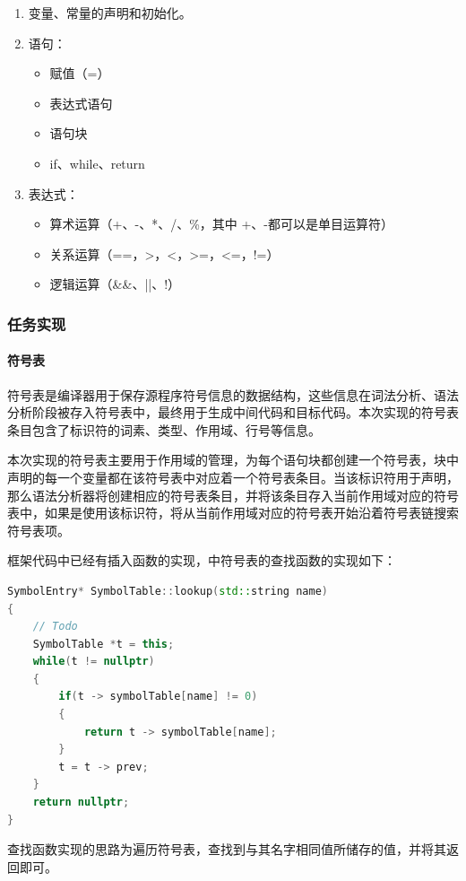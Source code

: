 \documentclass[UTF8,a4paper,10pt]{ctexart}
\begin{document}
\begin{enumerate}
  \item 变量、常量的声明和初始化。
  \item 语句：
  \begin{itemize}
    \item 赋值（=）
    \item 表达式语句
    \item 语句块
    \item if、while、return
  \end{itemize}
  \item 表达式：
  \begin{itemize}
    \item 算术运算（+、-、*、/、\%，其中 +、-都可以是单目运算符）
    \item 关系运算（==，>，<，>=，<=，!=）
    \item 逻辑运算（\&\&、||、!）
  \end{itemize}
\end{enumerate}

\subsubsection{任务实现}
\paragraph{符号表}
符号表是编译器用于保存源程序符号信息的数据结构，这些信息在词法分析、语法分析阶段被存入符号表中，最终用于生成中间代码和目标代码。本次实现的符号表条目包含了标识符的词素、类型、作用域、行号等信息。

本次实现的符号表主要用于作用域的管理，为每个语句块都创建一个符号表，块中声明的每一个变量都在该符号表中对应着一个符号表条目。当该标识符用于声明，那么语法分析器将创建相应的符号表条目，并将该条目存入当前作用域对应的符号表中，如果是使用该标识符，将从当前作用域对应的符号表开始沿着符号表链搜索符号表项。

框架代码中已经有插入函数的实现，中符号表的查找函数的实现如下：
\begin{lstlisting}[title = 查找函数, language = c++]
SymbolEntry* SymbolTable::lookup(std::string name)
{
    // Todo
    SymbolTable *t = this;
    while(t != nullptr)
    {
        if(t -> symbolTable[name] != 0)
        {
            return t -> symbolTable[name];
        }
        t = t -> prev;
    }
    return nullptr;
}
\end{lstlisting}
查找函数实现的思路为遍历符号表，查找到与其名字相同值所储存的值，并将其返回即可。
\end{document}

